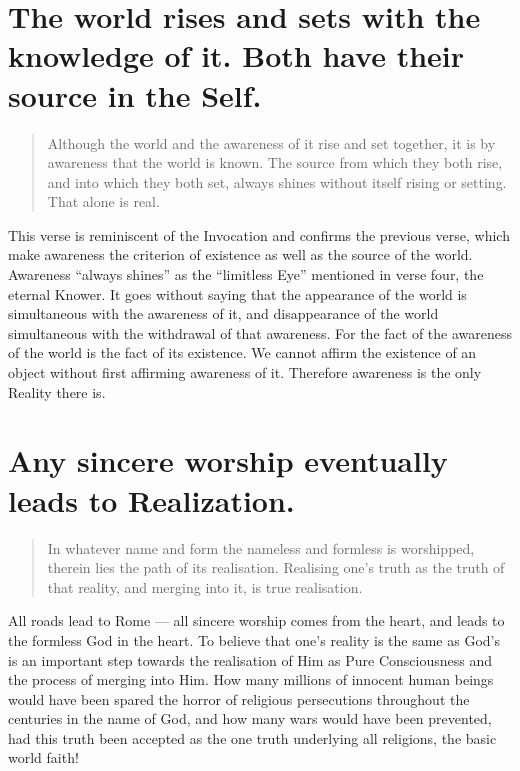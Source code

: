 \documentclass[12pt]{report}
\begin{document}
\section{ The world rises and sets with the knowledge of it. Both
  have their source in the Self.}

\begin{quote}
  Although the world and the awareness of it rise and set together, it
  is by awareness that the world is known. The source from which they
  both rise, and into which they both set, always shines without itself
  rising or setting. That alone is real.
\end{quote}


This verse is reminiscent of the Invocation and confirms the previous
verse, which make awareness the criterion of existence as well as the
source of the world. Awareness ``always shines'' as the ``limitless
Eye'' mentioned in verse four, the eternal Knower. It goes without
saying that the appearance of the world is simultaneous with the
awareness of it, and disappearance of the world simultaneous with the
withdrawal of that awareness. For the fact of the awareness of the
world is the fact of its existence. We cannot affirm the existence of
an object without first affirming awareness of it. Therefore awareness
is the only Reality there is.

\section{ Any sincere worship eventually leads to Realization.}

\begin{quote}
  In whatever name and form the nameless and formless is worshipped,
  therein lies the path of its realisation. Realising one's truth as the
  truth of that reality, and merging into it, is true realisation.
\end{quote}


All roads lead to Rome --- all sincere worship comes from the heart,
and leads to the formless God in the heart. To believe that one's
reality is the same as God's is an important step towards the
realisation of Him as Pure Consciousness and the process of merging
into Him. How many millions of innocent human beings would have been
spared the horror of religious persecutions throughout the centuries
in the name of God, and how many wars would have been prevented, had
this truth been accepted as the one truth underlying all religions,
the basic world faith!
\end{document}
